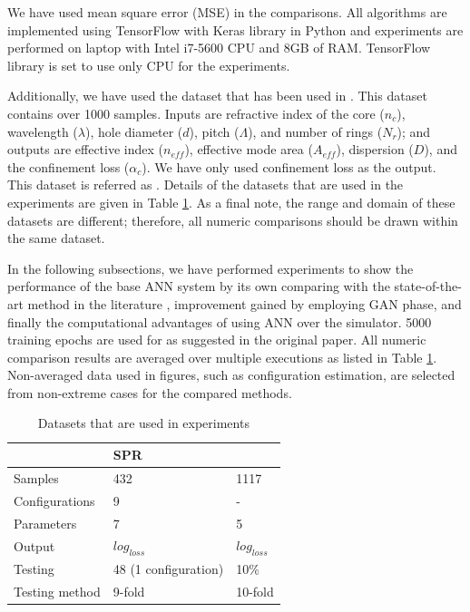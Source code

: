 \documentclass[10pt]{IEEEtran}
\begin{document}
We have used mean square error (MSE) in the comparisons. All algorithms are implemented using TensorFlow with Keras library in Python and experiments are performed on laptop with Intel i7-5600 CPU and 8GB of RAM. TensorFlow library is set to use only CPU for the experiments.

Additionally, we have used the dataset that has been used in \cite{paper0}. This dataset contains over 1000 samples. Inputs are refractive index of the core ($n_c$), wavelength ($\lambda$), hole diameter ($d$), pitch ($\Lambda$), and number of rings ($N_r$);  and outputs are effective index ($n_{eff}$), effective mode area ($A_{eff}$), dispersion ($D$), and the confinement loss ($\alpha_c$). We have only used confinement loss as the output. This dataset is referred as \dszero. Details of the datasets that are used in the experiments are given in Table \ref{tbl:dataset}. As a final note, the range and domain of these datasets are different; therefore, all numeric comparisons should be drawn within the same dataset.

In the following subsections, we have performed experiments to show the performance of the base ANN system by its own comparing with the state-of-the-art method in the literature \cite{paper0}, improvement gained by employing GAN phase, and finally the computational advantages of using ANN over the simulator. 5000 training epochs are used for \cite{paper0} as suggested in the original paper. All numeric comparison results are averaged over multiple executions as listed in Table \ref{tbl:dataset}. Non-averaged data used in figures, such as configuration estimation, are selected from non-extreme cases for the compared methods.

\begin{table}
\centering
\caption{Datasets that are used in experiments}
\begin{tabular}{l|l|l}
	~ & SPR & \dszero \\\hline
	Samples & 432 & 1117\\
	Configurations & 9 & - \\
	Parameters & 7 & 5 \\
	Output & $log_{loss}$ & $log_{loss}$ \\
	Testing & 48 (1 configuration) & 10\% \\
	Testing method & 9-fold & 10-fold \\
\end{tabular}
\label{tbl:dataset}
\end{table}
\end{document}
